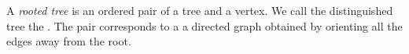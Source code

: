 


A \emph{rooted tree}
is an ordered pair of
a tree and a vertex.
We call the
distinguished tree
the .
The pair corresponds to a
a directed graph obtained by
orienting all the edges away
from the root.
